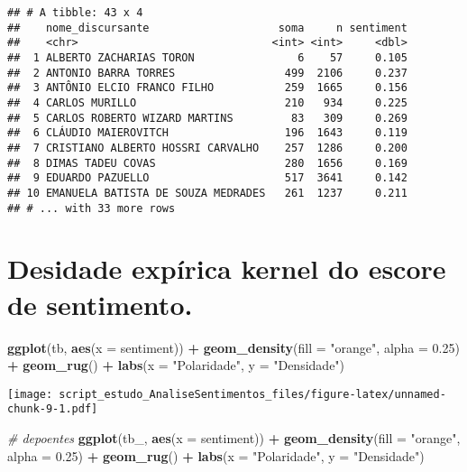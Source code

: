 \documentclass[
]{article}
\newenvironment{Shaded}{\begin{snugshade}}{\end{snugshade}}
\newcommand{\CommentTok}[1]{\textcolor[rgb]{0.56,0.35,0.01}{\textit{#1}}}
\newcommand{\DataTypeTok}[1]{\textcolor[rgb]{0.13,0.29,0.53}{#1}}
\newcommand{\FloatTok}[1]{\textcolor[rgb]{0.00,0.00,0.81}{#1}}
\newcommand{\KeywordTok}[1]{\textcolor[rgb]{0.13,0.29,0.53}{\textbf{#1}}}
\newcommand{\NormalTok}[1]{#1}
\newcommand{\OperatorTok}[1]{\textcolor[rgb]{0.81,0.36,0.00}{\textbf{#1}}}
\newcommand{\StringTok}[1]{\textcolor[rgb]{0.31,0.60,0.02}{#1}}
\begin{document}
\begin{verbatim}
## # A tibble: 43 x 4
##    nome_discursante                    soma     n sentiment
##    <chr>                              <int> <int>     <dbl>
##  1 ALBERTO ZACHARIAS TORON                6    57     0.105
##  2 ANTONIO BARRA TORRES                 499  2106     0.237
##  3 ANTÔNIO ELCIO FRANCO FILHO           259  1665     0.156
##  4 CARLOS MURILLO                       210   934     0.225
##  5 CARLOS ROBERTO WIZARD MARTINS         83   309     0.269
##  6 CLÁUDIO MAIEROVITCH                  196  1643     0.119
##  7 CRISTIANO ALBERTO HOSSRI CARVALHO    257  1286     0.200
##  8 DIMAS TADEU COVAS                    280  1656     0.169
##  9 EDUARDO PAZUELLO                     517  3641     0.142
## 10 EMANUELA BATISTA DE SOUZA MEDRADES   261  1237     0.211
## # ... with 33 more rows
\end{verbatim}

\hypertarget{desidade-expuxedrica-kernel-do-escore-de-sentimento.}{%
\section{Desidade expírica kernel do escore de
sentimento.}\label{desidade-expuxedrica-kernel-do-escore-de-sentimento.}}

\begin{Shaded}
\begin{Highlighting}[]
\KeywordTok{ggplot}\NormalTok{(tb, }\KeywordTok{aes}\NormalTok{(}\DataTypeTok{x =}\NormalTok{ sentiment)) }\OperatorTok{+}
\StringTok{    }\KeywordTok{geom_density}\NormalTok{(}\DataTypeTok{fill =} \StringTok{"orange"}\NormalTok{, }\DataTypeTok{alpha =} \FloatTok{0.25}\NormalTok{) }\OperatorTok{+}
\StringTok{    }\KeywordTok{geom_rug}\NormalTok{() }\OperatorTok{+}
\StringTok{    }\KeywordTok{labs}\NormalTok{(}\DataTypeTok{x =} \StringTok{"Polaridade"}\NormalTok{, }\DataTypeTok{y =} \StringTok{"Densidade"}\NormalTok{)}
\end{Highlighting}
\end{Shaded}

\texttt{[image: script\_estudo\_AnaliseSentimentos\_files/figure-latex/unnamed-chunk-9-1.pdf]}

\begin{Shaded}
\begin{Highlighting}[]
\CommentTok{# depoentes}
\KeywordTok{ggplot}\NormalTok{(tb_, }\KeywordTok{aes}\NormalTok{(}\DataTypeTok{x =}\NormalTok{ sentiment)) }\OperatorTok{+}
\StringTok{    }\KeywordTok{geom_density}\NormalTok{(}\DataTypeTok{fill =} \StringTok{"orange"}\NormalTok{, }\DataTypeTok{alpha =} \FloatTok{0.25}\NormalTok{) }\OperatorTok{+}
\StringTok{    }\KeywordTok{geom_rug}\NormalTok{() }\OperatorTok{+}
\StringTok{    }\KeywordTok{labs}\NormalTok{(}\DataTypeTok{x =} \StringTok{"Polaridade"}\NormalTok{, }\DataTypeTok{y =} \StringTok{"Densidade"}\NormalTok{)}
\end{Highlighting}
\end{Shaded}
\end{document}

